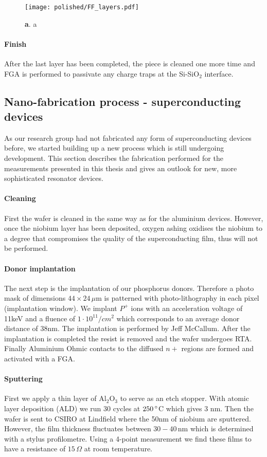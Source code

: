 \begin{figure}
	\centering
	\texttt{[image: polished/FF\_layers.pdf]}
	\caption[SEM FF]{\textbf{a}. a }
	\label{fig:ff_layers}
\end{figure}

\paragraph*{Finish}
After the last layer has been completed, the piece is cleaned one more time and FGA is performed to passivate any charge traps at the Si-SiO$_2$ interface\cite{Brower1988}.

\subsection{Nano-fabrication process - superconducting devices}

As our research group had not fabricated any form of superconducting devices before, we started building up a new process which is still undergoing development. This section describes the fabrication performed for the measurements presented in this thesis and gives an outlook for new, more sophisticated resonator devices. 

\paragraph*{Cleaning} 
First the wafer is cleaned in the same way as for the aluminium devices. However, once the niobium layer has been deposited, oxygen ashing oxidises the niobium to a degree that compromises the quality of the superconducting film, thus will not be performed.

\paragraph*{Donor implantation}
The next step is the implantation of our phosphorus donors. Therefore a photo mask of dimensions  $44\times24\,\mu$m is patterned with photo-lithography in each pixel (implantation window). We implant $P^+$ ions with an acceleration voltage of 11keV and a fluence of $1\cdot 10^{11}/cm^2$ which corresponds to an average donor distance of 38nm. The implantation is performed by Jeff McCallum. After the implantation is completed the resist is removed and the wafer undergoes RTA. Finally Aluminium Ohmic contacts to the diffused $n+$ regions are formed and activated with a FGA.

\paragraph*{Sputtering}
First we apply a thin layer of Al$_2$O$_3$ to serve as an etch stopper. With atomic layer deposition (ALD) we run 30 cycles at $250\,\degree$C which gives 3 nm. 
Then the wafer is sent to CSIRO at Lindfield where the 50nm of niobium are sputtered. However, the film thickness fluctuates between $30-40\,$nm which is determined with a stylus profilometre. Using a 4-point measurement we find these films to have a resistance of $15\,\Omega$ at room temperature. 

